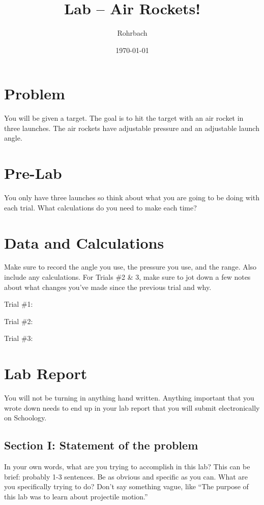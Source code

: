 \documentclass[10pt]{exam}
\title{Lab -- Air Rockets!}
\author{Rohrbach}
\date{\today}
\begin{document}
\maketitle

\section*{Problem} You will be given a target.  The goal is to hit the target with an air rocket in three launches. The air rockets have adjustable pressure and an adjustable launch angle.


\section*{Pre-Lab} You only have three launches so think about what you are going to be doing with each trial.  What calculations do you need to make each time?

\vs


\section*{Data and Calculations} Make sure to record the angle you use, the pressure you use, and the range.  Also include any calculations.  For Trials \#2 \& 3, make sure to jot down a few notes about what changes you've made since the previous trial and why.

\vspace{2em}

Trial \#1:  
\vs

Trial \#2:
\vs

Trial \#3:  
\vs

\pagebreak


\section*{Lab Report} You will not be turning in anything hand written.  Anything important that you wrote down needs to end up in your lab report that you will submit electronically on Schoology.

\subsection*{Section I: Statement of the problem}
In your own words, what are you trying to accomplish in this lab?  This can be brief: probably 1-3 sentences.  Be as obvious and specific as you can.  What are you specifically trying to do?  Don't say something vague, like ``The purpose of this lab was to learn about projectile motion.''
\end{document}
